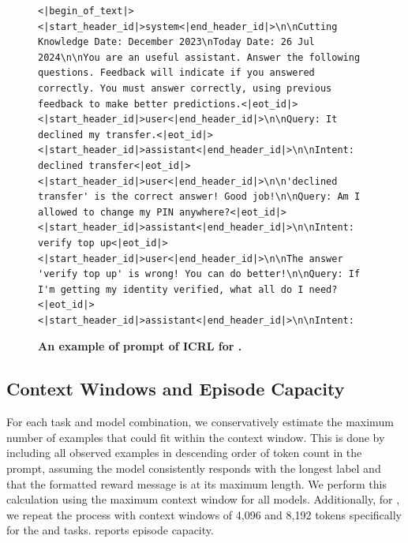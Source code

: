 \begin{figure}[ht]
    \centering
    \begin{tcolorbox}[width=0.9\textwidth, fonttitle=\bfseries, title={Prompt example for ICRL in \llama}]
\begin{Verbatim}[breaklines=true, breakanywhere=true]
<|begin_of_text|><|start_header_id|>system<|end_header_id|>\n\nCutting Knowledge Date: December 2023\nToday Date: 26 Jul 2024\n\nYou are an useful assistant. Answer the following questions. Feedback will indicate if you answered correctly. You must answer correctly, using previous feedback to make better predictions.<|eot_id|><|start_header_id|>user<|end_header_id|>\n\nQuery: It declined my transfer.<|eot_id|><|start_header_id|>assistant<|end_header_id|>\n\nIntent: declined transfer<|eot_id|><|start_header_id|>user<|end_header_id|>\n\n'declined transfer' is the correct answer! Good job!\n\nQuery: Am I allowed to change my PIN anywhere?<|eot_id|><|start_header_id|>assistant<|end_header_id|>\n\nIntent: verify top up<|eot_id|><|start_header_id|>user<|end_header_id|>\n\nThe answer 'verify top up' is wrong! You can do better!\n\nQuery: If I'm getting my identity verified, what all do I need?<|eot_id|><|start_header_id|>assistant<|end_header_id|>\n\nIntent:
\end{Verbatim}
    \end{tcolorbox}
    \caption{\textbf{An example of prompt of ICRL for \llama.}}
    \label{fig:prompt_example_icrl}
\end{figure}










\subsection{Context Windows and Episode Capacity}\label{appendix:exp_setup:data}

For each task and model combination, we conservatively estimate the maximum number of examples that could fit within the context window. This is done by including all observed examples in descending order of token count in the prompt, assuming the model consistently responds with the longest label and that the formatted reward message is at its maximum length. We perform this calculation using the maximum context window for all models. Additionally, for \llama, we repeat the process with context windows of 4{,}096 and 8{,}192 tokens specifically for the \banking and \clinic tasks. 
 reports episode capacity.

